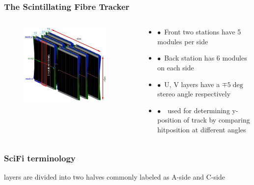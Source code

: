 \documentclass[aspectratio=1610, 12pt]{beamer}
\begin{document}
\begin{frame}\frametitle{The Scintillating Fibre Tracker}
  \begin{columns}
    \begin{column}[c]{0.48\textwidth}
      \begin{figure}
        \includegraphics[width=0.9\textwidth]{logos/scifi.png}
      \end{figure}
    \end{column}
    \begin{column}{0.48\textwidth}
      \begin{itemize}
        \item $\bullet$\, Front two stations have 5 modules per side
        \item $\bullet$\, Back station has 6 modules on each side
        \item $\bullet$\, U, V layers have a $\mp 5 \deg$ stereo angle respectively
        \item $\bullet$\, \to\, used for determining y-position of track by comparing hitposition at different angles
      \end{itemize}
    \end{column}
  \end{columns}
\end{frame}

\begin{frame}\frametitle{SciFi terminology}
layers are divided into two halves commonly labeled as A-side and C-side
  
\end{frame}
\end{document}
